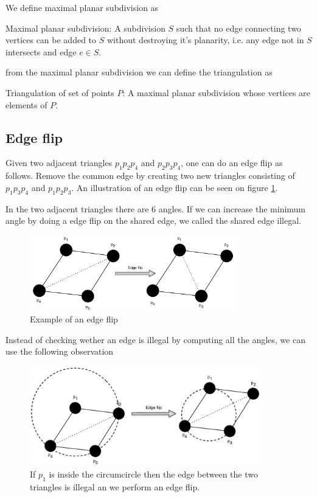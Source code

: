 \documentclass[10pt]{article}
\begin{document}
We define maximal planar subdivision as
\begin{definition}
Maximal planar subdivision: A subdivision $S$ such that no edge connecting two vertices can be added to $S$ without destroying it's planarity, i.e. any edge not in $S$ intersects and edge $e \in S$.  
\end{definition}
from the maximal planar subdivision we can define the triangulation as
\begin{definition}
Triangulation of set of points $P$: A maximal planar subdivision whose vertices are elements of $P$.  
\end{definition}




\subsection{Edge flip} %
\label{sub:edge_flip}
Given two adjacent triangles $p_1 p_2 p_4$ and $p_2 p_3 p_4$, one can do an edge flip as follows. Remove the common edge by creating two new triangles consisting of $p_1 p_3 p_4$ and $p_1 p_2 p_3$. An illustration of an edge flip can be seen on figure \ref{fig6}.

In the two adjacent triangles there are 6 angles. If we can increase the minimum angle by doing a edge flip on the shared edge, we called the shared edge illegal.

\begin{figure}[ht]
\centering
\includegraphics[width=0.8\textwidth]{figures/fig6.pdf}
\caption{Example of an edge flip}
\label{fig6}
\end{figure}

Instead of checking wether an edge is illegal by computing all the angles, we can use the following observation

\begin{figure}[ht]
\centering
\includegraphics[width=0.9\textwidth]{figures/fig7.pdf}
\caption{If $p_1$ is inside the circumcircle then the edge between the two triangles is illegal an we perform an edge flip.}
\label{fig7}
\end{figure}
\end{document}
